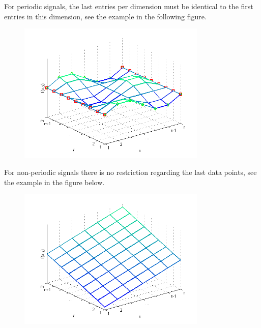 For periodic signals, the last entries per dimension must be identical to the first entries in this dimension, see the example in the following figure.
\begin{figure}[H]
	\includegraphics[width=0.8\textwidth]{LookupTable2D_periodic}
\end{figure}
For non-periodic signals there is no restriction regarding the last data points, see the example in the figure below.
\begin{figure}[H]
	\includegraphics[width=0.8\textwidth]{LookupTable2D_non-periodic}
\end{figure}